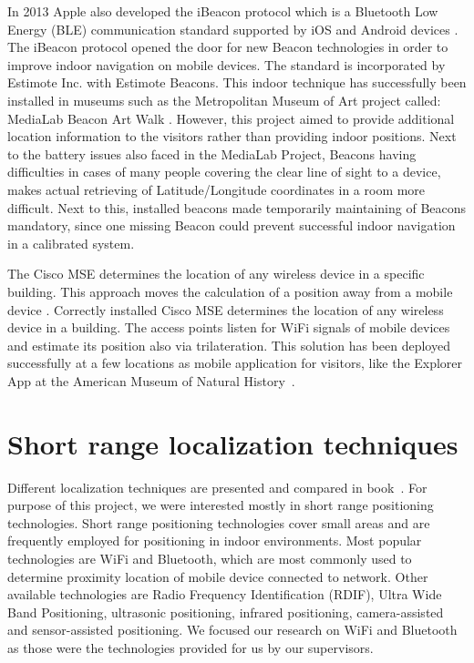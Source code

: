 In 2013 Apple also developed the iBeacon protocol which is a Bluetooth Low Energy (BLE) communication standard supported by iOS and Android devices \cite{iBeacon}. The iBeacon protocol opened the door for new Beacon technologies in order to improve indoor navigation on mobile devices. The standard is incorporated by Estimote Inc. with Estimote Beacons. This indoor technique has successfully been installed in museums such as the Metropolitan Museum of Art project called: MediaLab Beacon Art Walk \cite{MOArt15}. However, this project aimed to provide additional location information to the visitors rather than providing indoor positions. Next to the battery issues also faced in the MediaLab Project, Beacons having difficulties  in cases of many people covering the clear line of sight to a device, makes actual retrieving of Latitude/Longitude coordinates in a room more difficult. Next to this, installed beacons made  temporarily maintaining of Beacons mandatory, since one missing Beacon could prevent successful indoor navigation in a calibrated system.

The Cisco MSE determines the location of any wireless device in a specific building. This approach moves the calculation of a position away from a mobile device \cite{oreilly11}. Correctly installed Cisco MSE determines the location of any wireless device in a building. The access points listen for WiFi signals of mobile devices and estimate its position also via trilateration. This solution has been deployed successfully at a few locations as mobile application for visitors, like the Explorer App  at the American Museum of Natural History~\cite{AMNH15}.


\vspace{0.5cm}

\section{Short range localization techniques}
\label{short_range_localization_techniques}
Different localization techniques are presented and compared in book~\cite{brimicombe2009location}. For purpose of this project, we were interested mostly in short range positioning technologies. Short range positioning technologies cover small areas and are frequently employed for positioning in indoor environments. Most popular technologies are WiFi and Bluetooth, which are most commonly used to determine proximity location of mobile device connected to network. Other available technologies are Radio Frequency Identification (RDIF), Ultra Wide Band Positioning, ultrasonic positioning, infrared positioning, camera-assisted and sensor-assisted positioning. We focused our research on WiFi and Bluetooth as those were the technologies provided for us by our supervisors.

